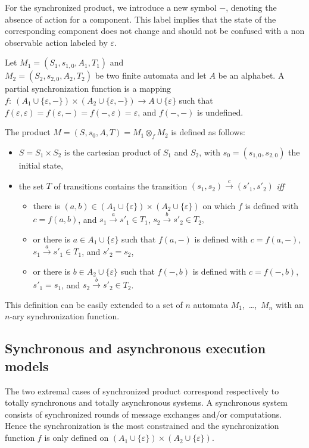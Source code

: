 For the synchronized product, we introduce a new symbol $-$, denoting
the absence of action for a component. This label implies that the
state of the corresponding component does not change and should not be
confused with a non observable action labeled by $\varepsilon$.
\begin{definition} 
\label{def:prod} 
  Let $M_1=(S_1,s_{1,0},A_1,T_1)$ and \\
  $M_2=(S_2,s_{2,0},A_2,T_2)$ be two finite automata and let $A$ be an alphabet. 
  A partial synchronization function is a mapping 
  $f:~(A_1 \cup \{\varepsilon, -\})\times(A_2 \cup
  \{\varepsilon, -\})\rightarrow A \cup \{\varepsilon\}$ such that $f(\varepsilon,
  \varepsilon) = f(\varepsilon, -) = f(-, \varepsilon) =\varepsilon$,
  and $f(-,-)$ is undefined.

The product $M=(S,s_0,A,T) = M_1 \otimes_f M_2 $ is defined as
follows: 

\begin{itemize}%
\item $S = S_1\times S_2 $ is the cartesian product of $S_1$ and $S_2$, 
with $s_0=(s_{1,0},s_{2,0})$ the initial state, 
\item the set $T$ of transitions contains the transition
$(s_1,s_2)\xrightarrow{c}(s'_1,s'_2)$ \textit{iff} 
\begin{itemize}%
\item there is $(a,b) \in (A_1\cup\{\varepsilon\}) \times
  (A_2 \cup \{\varepsilon\})$ on which $f$ is defined with
  $c=f(a,b)$, and $s_1 \xrightarrow{a} s'_1 \in T_1$, $s_2
  \xrightarrow{b} s'_2 \in T_2,$
\item or there is $a \in A_1\cup\{\varepsilon\}$ such that
  $f(a,-)$ is defined with $c=f(a,-)$, $s_1\xrightarrow{a}s'_1 \in
  T_1$, and $s'_2 = s_2$,
\item or there is $b \in A_2\cup\{\varepsilon\}$ such that
  $f(-,b)$ is defined with $c=f(-,b)$, $s'_1 = s_1$, and
  $s_2\xrightarrow{b}s'_2 \in T_2$.
\end{itemize} 
\end{itemize} 
\end{definition} 

This definition can be easily extended to a set of $n$ automata
$M_1$,~\dots,~$M_n$ with an $n$-ary synchronization function.


	\subsection{Synchronous and asynchronous execution models}
The two extremal cases of synchronized product correspond respectively to totally synchronous and totally asynchronous systems.
A synchronous system consists of synchronized rounds of message
exchanges and/or computations.  Hence the synchronization is the most
constrained and the synchronization function $f$ is only defined on
$(A_1\cup\{\varepsilon\}) \times (A_2 \cup \{\varepsilon\})$.

